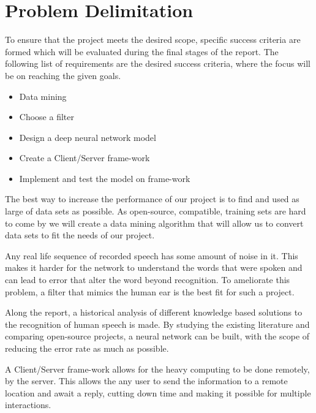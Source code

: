 \section{Problem Delimitation}
To ensure that the project meets the desired scope,
specific success criteria are formed which will be
evaluated during the final stages of the report.
The following list of requirements are the desired
success criteria, where the focus will be on reaching
the given goals.

\begin{itemize}
	\item Data mining
	\item Choose a filter
	\item Design a deep neural network model
	\item Create a Client/Server frame-work
	\item Implement and test the model on frame-work
\end{itemize}

The best way to increase the performance of our project is to find and used as large of data sets as possible. As open-source, compatible, training sets are hard to come by we will create a data mining algorithm
that will allow us to convert data sets to fit the needs of our project.

Any real life sequence of recorded speech has some amount of noise in 
it. This makes it harder for the network to understand the words that
were spoken and can lead to error that alter the word beyond 
recognition. To ameliorate this problem, a filter that mimics the human
ear is the best fit for such a project.

Along the report, a historical analysis of different knowledge
based solutions to the recognition of human speech is made.  By studying
the existing literature and comparing open-source projects, a neural 
network can be built, with the scope of reducing the error rate as much
as possible.

A Client/Server frame-work allows for the heavy computing to be done
remotely, by the server. This allows the any user to send the 
information to a remote location and await a reply, cutting down time
and making it possible for multiple interactions.


